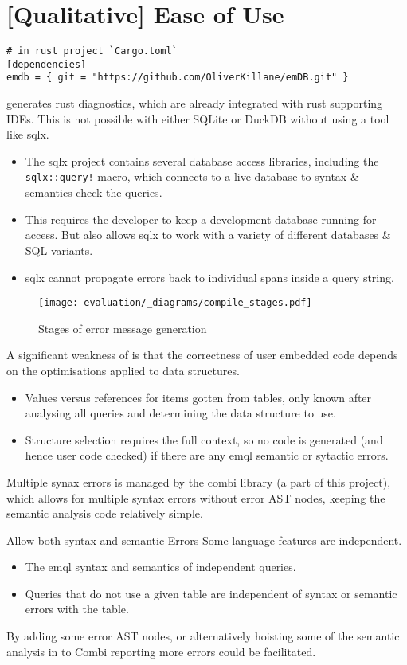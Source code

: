 \section{[Qualitative] Ease of Use}
\begin{verbatim}
# in rust project `Cargo.toml`
[dependencies]
emdb = { git = "https://github.com/OliverKillane/emDB.git" }
\end{verbatim}
\emdb generates rust diagnostics, which are already integrated with rust supporting IDEs.
This is not possible with either SQLite or DuckDB without using a tool like sqlx.
\begin{itemize}
    \setlength\itemsep{0em}
    \item The sqlx project contains several database access libraries, including the
          \texttt{sqlx::query!} macro, which connects to a live database to syntax
          \& semantics check the queries.
    \item This requires the developer to keep a development database running for access. But also
          allows sqlx to work with a variety of different databases \& SQL variants.
    \item sqlx cannot propagate errors back to individual spans inside a query string.
\end{itemize}
\begin{figure}[h]
    \centering
    \texttt{[image: evaluation/\_diagrams/compile\_stages.pdf]}
    \caption{Stages of error message generation}
    \label{fig:error_message_gen}
\end{figure}
A significant weakness of \emdb is that the correctness of user embedded code depends on the optimisations applied to data structures.
\begin{itemize}
    \setlength\itemsep{0em}
    \item Values versus references for items gotten from tables, only known after analysing all queries and determining the data structure to use.
    \item Structure selection requires the full context, so no code is generated (and hence user code checked) if there are any emql semantic or sytactic errors.
\end{itemize}
Multiple synax errors is managed by the combi library (a part of this project), which allows for multiple syntax errors without error AST nodes, keeping the semantic analysis code relatively simple.

\begin{futurebox}{Allow both syntax and semantic Errors}
    Some language features are independent.
    \begin{itemize}
        \setlength\itemsep{0em}
        \item The emql syntax and semantics of independent queries.
        \item Queries that do not use a given table are independent of syntax or semantic errors with the table.
    \end{itemize}
    By adding some error AST nodes, or alternatively hoisting some of the semantic analysis in to Combi reporting more errors could be facilitated.
\end{futurebox}

